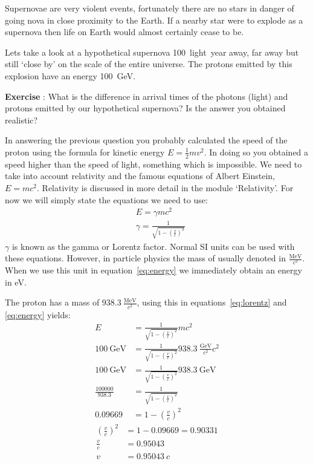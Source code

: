 \documentclass[12pt,a4paper]{article}
\numberwithin{equation}{section}
\numberwithin{figure}{section}
\newcounter{Exercise}
\numberwithin{table}{section}
\begin{document}
Supernovae are very violent events, fortunately there are no stars in danger of going nova in close proximity to the Earth. If a nearby star were to explode as a supernova then life on Earth would almost certainly cease to be.

Lets take a look at a hypothetical supernova 100~light~year away, far away but still `close by' on the scale of the entire universe. The protons emitted by this explosion have an energy 100~GeV.
\begin{shaded}
\textbf{Exercise \theExercise {}} : What is the difference in arrival times of the photons (light) and protons emitted by our hypothetical supernova? Is the answer you obtained realistic?\end{shaded}

In answering the previous question you probably calculated the speed of the proton using the formula for kinetic energy $E=\frac{1}{2}mv^2$. In doing so you obtained a speed higher than the speed of light, something which is impossible. We need to take into account relativity and the famous equations of Albert Einstein, $E=mc^2$. Relativity is discussed in more detail in the module `Relativity'. For now we will simply state the equations we need to use:
\begin{align}
& E=\gamma mc^2 \label{eq:energy}\\
& \gamma = \frac{1}{\sqrt{1-\left( \frac{v}{c} \right)^2 }} \label{eq:lorentz}
\end{align}
$\gamma$ is known as the gamma or Lorentz factor. Normal SI units can be used with these equations. However, in particle physics the mass of usually denoted in $\frac{\mbox{MeV}}{c^2}$. When we use this unit in equation~\ref{eq:energy} we immediately obtain an energy in eV.

The proton has a mass of $938.3~\frac{\mbox{MeV}}{c^2}$, using this in equations~\ref{eq:lorentz} and \ref{eq:energy} yields:
\begin{align}
E &= \frac{1}{\sqrt{1-\left( \frac{v}{c}\right)^2}} mc^2 \\
100~\mbox{GeV} &= \frac{1}{\sqrt{1-\left( \frac{v}{c}\right)^2}} 938.3~\frac{\mbox{GeV}}{c^2}c^2 \\
100~\mbox{GeV} &= \frac{1}{\sqrt{1-\left( \frac{v}{c}\right)^2}} 938.3~\mbox{GeV} \\
\frac{100000}{938.3} &= \frac{1}{\sqrt{1-\left( \frac{v}{c}\right)^2}} \\
0.09669 &= 1 - \left( \frac{v}{c} \right)^2 
\end{align}
\begin{align}
\left( \frac{v}{c} \right)^2 &= 1-0.09669=0.90331 \\
\frac{v}{c} &= 0.95043 \\
v &= 0.95043~c
\end{align}
\end{document}
